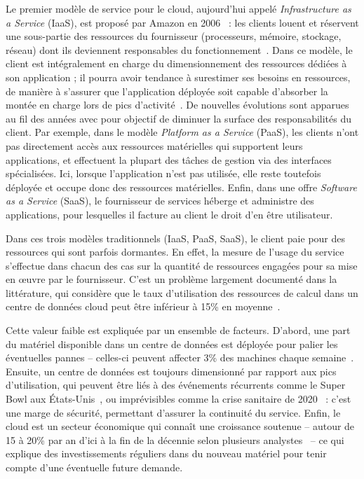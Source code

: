 Le premier modèle de service pour le cloud, aujourd'hui appelé \textit{Infrastructure as a Service} (\gls{IaaS}), est proposé par Amazon en 2006~\cite{AmazonEC2Beta2006} : les clients louent et réservent une sous-partie des ressources du fournisseur (processeurs, mémoire, stockage, réseau) dont ils deviennent responsables du fonctionnement~\cite{mellNISTDefinitionCloud}. Dans ce modèle, le client est intégralement en charge du dimensionnement des ressources dédiées à son application ; il pourra avoir tendance à surestimer ses besoins en ressources, de manière à s'assurer que l'application déployée soit capable d'absorber la montée en charge lors de pics d'activité~\cite{takMoveNotMove}. De nouvelles évolutions sont apparues au fil des années avec pour objectif de diminuer la surface des responsabilités du client. Par exemple, dans le modèle \textit{Platform as a Service} (\gls{PaaS}), les clients n'ont pas directement accès aux ressources matérielles qui supportent leurs applications, et effectuent la plupart des tâches de gestion via des interfaces spécialisées. Ici, lorsque l'application n'est pas utilisée, elle reste toutefois déployée et occupe donc des ressources matérielles. Enfin, dans une offre \textit{Software as a Service} (\gls{SaaS}), le fournisseur de services héberge et administre des applications, pour lesquelles il facture au client le droit d'en être utilisateur.

Dans ces trois modèles traditionnels (\gls{IaaS}, \gls{PaaS}, \gls{SaaS}), le client paie pour des ressources qui sont parfois dormantes. En effet, la mesure de l'usage du service s'effectue dans chacun des cas sur la quantité de ressources engagées pour sa mise en œuvre par le fournisseur. C'est un problème largement documenté dans la littérature, qui considère que le taux d'utilisation des ressources de calcul dans un centre de données cloud peut être inférieur à 15\% en moyenne~\cite{vasanWorthTheirWatts2010, vermaLargescaleClusterManagement2015a}.

Cette valeur faible est expliquée par un ensemble de facteurs. D'abord, une part du matériel disponible dans un centre de données est déployée pour palier les éventuelles pannes -- celles-ci peuvent affecter 3\% des machines chaque semaine~\cite{BareMetal70B}. Ensuite, un centre de données est toujours dimensionné par rapport aux pics d'utilisation, qui peuvent être liés à des événements récurrents comme le Super Bowl aux États-Unis~\cite{wangTouchdownCloudImpact2019}, ou imprévisibles comme la crise sanitaire de 2020~\cite{alashhabImpactCoronavirusPandemic2021} : c'est une marge de sécurité, permettant d'assurer la continuité du service. Enfin, le cloud est un secteur économique qui connaît une croissance soutenue -- autour de 15 à 20\% par an d'ici à la fin de la décennie selon plusieurs analystes~\cite{CloudComputingMarket, WorldwideSpendingPublic} -- ce qui explique des investissements réguliers dans du nouveau matériel pour tenir compte d'une éventuelle future demande.

